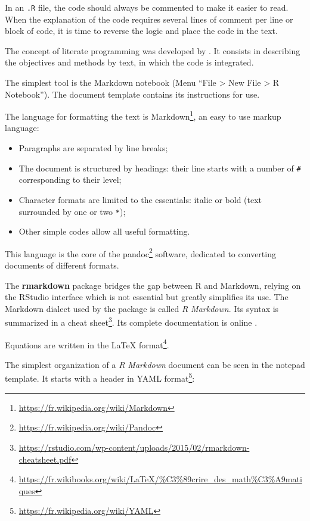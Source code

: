 \documentclass[
  12pt,
  american,
  a4paper,
  extrafontsizes,onecolumn,openright
  ]{memoir}
\providecommand{\tightlist}{%
  \setlength{\itemsep}{0pt}\setlength{\parskip}{0pt}}
\newlength{\rf}
\begin{document}
In an \texttt{.R} file, the code should always be commented to make it easier to read.
When the explanation of the code requires several lines of comment per line or block of code, it is time to reverse the logic and place the code in the text.

The concept of literate programming was developed by \textcite{Knuth1984}.
It consists in describing the objectives and methods by text, in which the code is integrated.

The simplest tool is the Markdown notebook (Menu \enquote{File \textgreater{} New File \textgreater{} R Notebook}).
The document template contains its instructions for use.

The language for formatting the text is Markdown\footnote{\url{https://fr.wikipedia.org/wiki/Markdown}}, an easy to use markup language:

\begin{itemize}
\tightlist
\item
  Paragraphs are separated by line breaks;
\item
  The document is structured by headings: their line starts with a number of \texttt{\#} corresponding to their level;
\item
  Character formats are limited to the essentials: italic or bold (text surrounded by one or two \texttt{*});
\item
  Other simple codes allow all useful formatting.
\end{itemize}

This language is the core of the pandoc\footnote{\url{https://fr.wikipedia.org/wiki/Pandoc}} software, dedicated to converting documents of different formats.

The \textbf{rmarkdown} package \autocite{Xie2015} bridges the gap between R and Markdown, relying on the RStudio interface which is not essential but greatly simplifies its use.
The Markdown dialect used by the package is called \emph{R Markdown}.
Its syntax is summarized in a cheat sheet\footnote{\url{https://rstudio.com/wp-content/uploads/2015/02/rmarkdown-cheatsheet.pdf}}.
Its complete documentation is online \autocite{Xie2018}.

Equations are written in the LaTeX format\footnote{\url{https://fr.wikibooks.org/wiki/LaTeX/\%C3\%89crire_des_math\%C3\%A9matiques}}.

The simplest organization of a \emph{R Markdown} document can be seen in the notepad template.
It starts with a header in YAML format\footnote{\url{https://fr.wikipedia.org/wiki/YAML}}:
\end{document}
